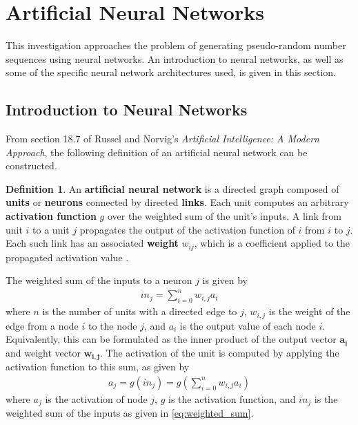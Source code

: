 \documentclass[12pt, titlepage]{report}
\theoremstyle{definition}
\newtheorem{definition}{Definition}
\begin{document}
\section{Artificial Neural Networks}
This investigation approaches the problem of generating pseudo-random number sequences using neural networks. An introduction to neural networks, as well as some of the specific neural network architectures used, is given in this section.



\subsection{Introduction to Neural Networks}\label{subsection:neural_intro}
From section 18.7 of Russel and Norvig's \textit{Artificial Intelligence: A Modern Approach}, the following definition of an artificial neural network can be constructed.

\begin{definition}
An \textbf{artificial neural network} is a directed graph composed of \textbf{units} or \textbf{neurons} connected by directed \textbf{links}. Each unit computes an arbitrary \textbf{activation function} $g$ over the weighted sum of the unit's inputs. A link from unit $i$ to a unit $j$ propagates the output of the activation function of $i$ from $i$ to $j$. Each such link has an associated \textbf{weight} $w_{ij}$, which is a coefficient applied to the propagated activation value \cite[p. 727-731]{russel2009artificial}.
\end{definition}

The weighted sum of the inputs to a neuron $j$ is given by
\begin{gather}\label{eq:weighted_sum}
in_j = \sum_{i=0}^{n} w_{i,j}a_i
\end{gather}
where $n$ is the number of units with a directed edge to $j$, $w_{i,j}$ is the weight of the edge from a node $i$ to the node $j$, and $a_i$ is the output value of each node $i$. Equivalently, this can be formulated as the inner product of the output vector $\bm{a_i}$ and weight vector $\bm{w_{i,j}}$. The activation of the unit is computed by applying the activation function to this sum, as given by
\begin{gather}\label{eq:activation}
a_j = g(in_j) = g\left(\sum_{i=0}^{n} w_{i,j}a_i\right)
\end{gather}
where $a_j$ is the activation of node $j$, $g$ is the activation function, and $in_j$ is the weighted sum of the inputs as given in \ref{eq:weighted_sum}.
\end{document}
